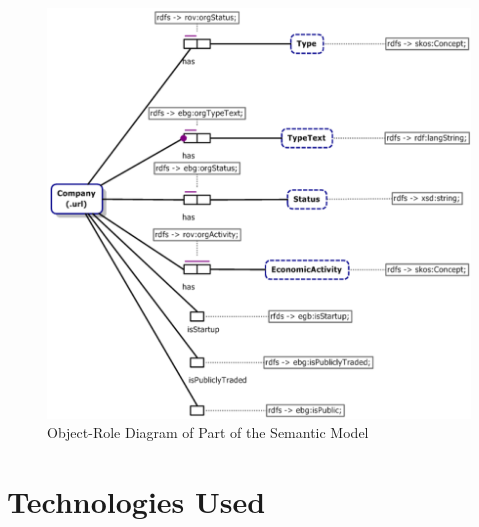\documentclass[runningheads,a4paper]{llncs}
\makeatletter
\def\maxwidth#1{\ifdim\Gin@nat@width>#1 #1\else\Gin@nat@width\fi}
\makeatother
\begin{document}
\begin{figure}[h!]
\centering
\includegraphics[width=\maxwidth{\textwidth}]{img/100000000000036300000348EF8D1F5319A59BDD.png}
\cprotect\caption{Object-Role Diagram of Part of the Semantic Model}
\label{refFigure5}
\end{figure}


\section{Technologies Used}
\end{document}

